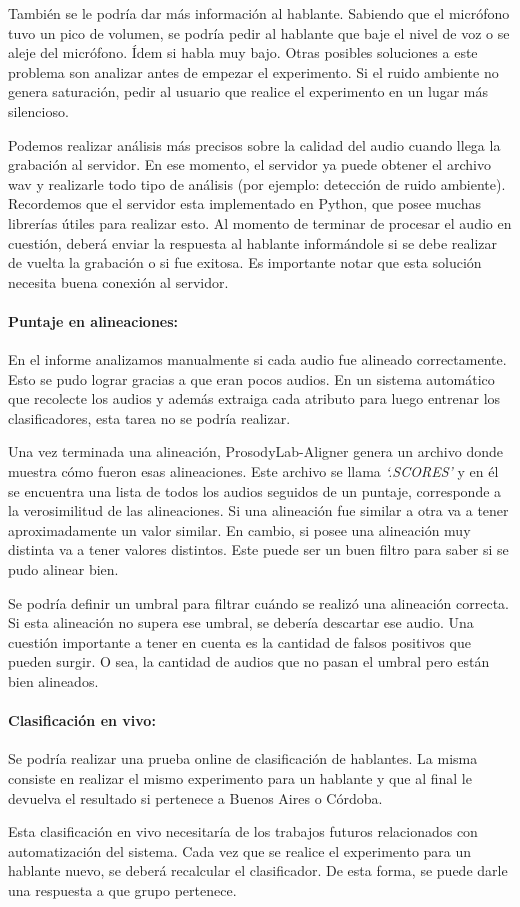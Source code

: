También se le podría dar más información al hablante. Sabiendo que el micrófono tuvo un pico de volumen, se podría pedir al hablante que baje el nivel de voz o se aleje del micrófono. Ídem si habla muy bajo. Otras posibles soluciones a este problema son analizar antes de empezar el experimento. Si el ruido ambiente no genera saturación, pedir al usuario que realice el experimento en un lugar más silencioso. 

Podemos realizar análisis más precisos sobre la calidad del audio cuando llega la grabación al servidor. En ese momento, el servidor ya puede obtener el archivo wav y realizarle todo tipo de análisis (por ejemplo: detección de ruido ambiente). Recordemos que el servidor esta implementado en Python, que posee muchas librerías útiles para realizar esto. Al momento de terminar de procesar el audio en cuestión, deberá enviar la respuesta al hablante informándole si se debe realizar de vuelta la grabación o si fue exitosa. Es importante notar que esta solución necesita buena conexión al servidor. 

\paragraph*{Puntaje en alineaciones:} En el informe analizamos manualmente si cada audio fue alineado correctamente. Esto se pudo lograr gracias a que eran pocos audios. En un sistema automático que recolecte los audios y además extraiga cada atributo para luego entrenar los clasificadores, esta tarea no se podría realizar.     

Una vez terminada una alineación, ProsodyLab-Aligner genera un archivo donde muestra cómo fueron esas alineaciones. Este archivo se llama \textit{`.SCORES’} y en él se encuentra una lista de todos los audios seguidos de un puntaje, corresponde a la verosimilitud de las alineaciones. Si una alineación fue similar a otra va a tener aproximadamente un valor similar. En cambio, si posee una alineación muy distinta va a tener valores distintos. Este puede ser un buen filtro para saber si se pudo alinear bien.

Se podría definir un umbral para filtrar cuándo se realizó una alineación correcta. Si esta alineación no supera ese umbral, se debería descartar ese audio. Una cuestión importante a tener en cuenta es la cantidad de falsos positivos que pueden surgir. O sea, la cantidad de audios que no pasan el umbral pero están bien alineados.   

\paragraph*{Clasificación en vivo:} Se podría realizar una prueba online de clasificación de hablantes. La misma consiste en realizar el mismo experimento para un hablante y que al final le devuelva el resultado si pertenece a Buenos Aires o Córdoba.

Esta clasificación en vivo necesitaría de los trabajos futuros relacionados con automatización del sistema. Cada vez que se realice el experimento para un hablante nuevo, se deberá recalcular el clasificador. De esta forma, se puede darle una respuesta a que grupo pertenece.